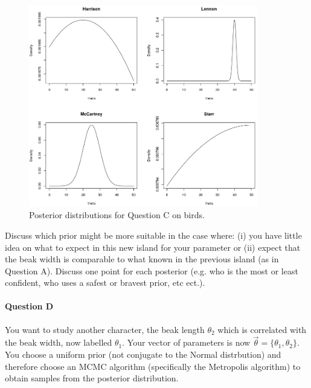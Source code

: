         \begin{figure}[!ht]
                \centering
                \includegraphics[width=10cm]{Figures/test.png}
                \caption{Posterior distributions for Question C on birds.}
        \end{figure}

        Discuss which prior might be more suitable in the case where: (i) you have little idea on what to expect
        in this new island for your parameter or (ii) expect that the beak width is comparable to what known
        in the previous island (as in Question A).
        Discuss one point for each posterior (e.g. who is the most or least confident, who uses a safest or
        bravest prior, etc ect.).

	\paragraph{Question D}

        You want to study another character, the beak length $\theta_2$ which is correlated with
        the beak width, now labelled $\theta_1$. Your vector of parameters is now
        $\vec{\theta}=\{\theta_1, \theta_2\}$.
        You choose a uniform prior (not conjugate to the Normal distrbution) and therefore choose
        an MCMC algorithm (specifically the Metropolis algorithm) to obtain samples from the
        posterior distribution.

